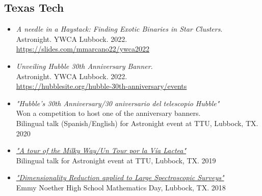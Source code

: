 \documentclass[letterpaper,10pt]{article}
\begin{document}
\subsection*{Texas Tech}

\begin{itemize}[label=$\blacktriangleright$]

	\item \textit{A needle in a Haystack: Finding Exotic Binaries in Star Clusters}. \\
Astronight. YWCA Lubbock. 2022. \\
\url{https://slides.com/mmarcano22/ywca2022}



	\item \textit{Unveiling Hubble 30th Anniversary Banner}. \\
Astronight. YWCA Lubbock. 2022. \\
\url{https://hubblesite.org/hubble-30th-anniversary/events}



	\item \textit{"Hubble's 30th Anniversary/30 aniversario del telescopio Hubble"} \\ Won a competition to host one of the anniversary banners. \\ Bilingual talk (Spanish/English) for Astronight event at TTU, Lubbock, TX. 2020
	



	\item \textit{\href{https://slides.com/mmarcano22/a-tour-of-the-milky-way-2\#/}{"A tour of the Milky Way/Un Tour por la V\'ia Lactea"}} \\ Bilingual talk for Astronight event at TTU, Lubbock, TX. 2019


	\item \textit{\href{http://manuelpm.me/PCASDSS/}{"Dimensionality Reduction applied to Large Spectroscopic Surveys"}} \\ Emmy Noether High School Mathematics Day, Lubbock, TX. 2018




\end{itemize}
\end{document}
